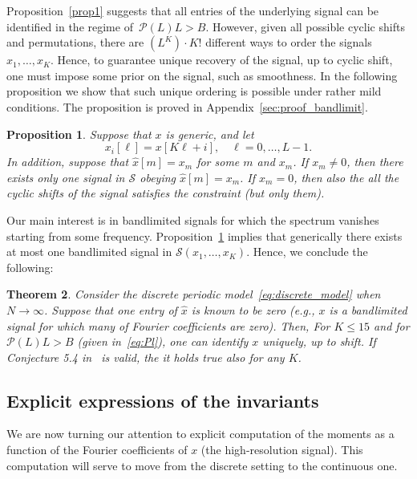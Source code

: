 \documentclass[english,12pt]{article}
\newcommand{\hx}{\hat{x}}
\newcommand{\TODO}[1]{{\color{red}{[#1]}}}
\newtheorem{thm}{Theorem}
\numberwithin{equation}{section}
\numberwithin{thm}{section} %
\newtheorem{prop}[thm]{Proposition}
\begin{document}
Proposition~\ref{prop1} suggests that all entries of the underlying signal can be identified in the regime of~$\mathcal{P}(L)L>B$. However, given all possible cyclic shifts and permutations, there are $(L^K)\cdot K!$ \TODO{check this number}  different ways to order the signals $x_1,\ldots,x_K$. Hence, to guarantee unique recovery of the signal, up to cyclic shift, one must impose some prior on the signal, such as smoothness. In the following proposition we show that such unique ordering is possible under rather mild conditions.
The proposition is proved  in Appendix~\ref{sec:proof_bandlimit}.
\begin{prop} \label{prop:bandlimit}
Suppose that $x$ is generic, and let 
\begin{equation} \label{eq:sub_signals}
x_i[\ell] = x[K\ell + i], \quad \ell=0,\ldots,L-1.
\end{equation}
In addition, suppose that $\hx[m]=x_m$ for some $m$ and $x_m$.
If $x_m\neq 0$, then there exists only one signal in $\mathcal{S}$ obeying $\hx[m]=x_m$. If $x_m=0$, then also the all the cyclic shifts of the signal satisfies the constraint (but only them). 
\end{prop}	

Our main interest is in bandlimited signals for which the spectrum vanishes starting from some frequency. Proposition~\ref{prop:bandlimit} implies that generically there exists at most one bandlimited signal in  $\mathcal{S}(x_1,\ldots,x_K)$.  
Hence, we conclude the following:
\begin{thm} \label{thm:discrete}
Consider the  discrete periodic model~\eqref{eq:discrete_model} when $N\to\infty$. Suppose that one entry of $\hx$ is known to be zero (e.g., $x$ is a bandlimited signal for which many of Fourier coefficients are zero). 
Then, For $K\leq 15$ and for $\mathcal{P}(L)L>B$ (given in~\eqref{eq:Pl}), one can identify $x$ uniquely, up to shift. 
If Conjecture 5.4 in~\cite{bandeira2017estimation} is valid, the it holds true also for any $K$.
\end{thm}

\subsection{Explicit expressions of the invariants} \label{sec:expressions}

We are now turning our attention to explicit computation of the moments as a function of the Fourier coefficients of $x$ (the high-resolution signal). This computation will serve to move from the discrete setting to the continuous one. 
\end{document}
